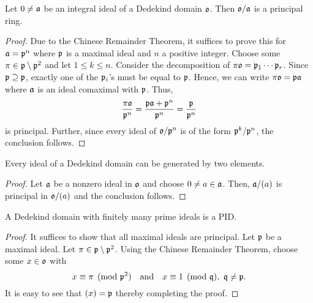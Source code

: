 \begin{proposition}
    Let $0\ne\mathfrak{a}$ be an integral ideal of a Dedekind domain $\mathfrak{o}$. Then $\mathfrak{o}/\mathfrak{a}$ is a principal ring.
\end{proposition}
\begin{proof}
    Due to the Chinese Remainder Theorem, it suffices to prove this for $\mathfrak{a} = \mathfrak{p}^n$ where $\mathfrak{p}$ is a maximal ideal and $n$ a positive integer. Choose some $\pi\in\mathfrak{p}\setminus\mathfrak{p}^2$ and let $1\le k\le n$. Consider the decomposition of $\pi\mathfrak{o} = \mathfrak{p}_1\cdots\mathfrak{p}_r$. Since $\mathfrak{p}\supseteq\mathfrak{p}$, exactly one of the $\mathfrak{p}_i$'s must be equal to $\mathfrak{p}$. Hence, we can write $\pi\mathfrak{o} = \mathfrak{p}\mathfrak{a}$ where $\mathfrak{a}$ is an ideal comaximal with $\mathfrak{p}$. Thus, 
    \begin{equation*}
        \frac{\pi\mathfrak{o}}{\mathfrak{p}^n} = \frac{\mathfrak{p}\mathfrak{a} + \mathfrak{p}^n}{\mathfrak{p}^n} = \frac{\mathfrak{p}}{\mathfrak{p}^n}
    \end{equation*}
    is principal. Further, since every ideal of $\mathfrak{o}/\mathfrak{p}^n$ is of the form $\mathfrak{p}^k/\mathfrak{p}^n$, the conclusion follows.
\end{proof}

\begin{corollary}
    Every ideal of a Dedekind domain can be generated by two elements.
\end{corollary}
\begin{proof}
    Let $\mathfrak{a}$ be a nonzero ideal in $\mathfrak{o}$ and choose $0\ne a\in\mathfrak{a}$. Then, $\mathfrak{a}/(a)$ is principal in $\mathfrak{o}/(a)$ and the conclusion follows.
\end{proof}

\begin{proposition}
    A Dedekind domain with finitely many prime ideals is a PID.
\end{proposition}
\begin{proof}
    It suffices to show that all maximal ideals are principal. Let $\mathfrak{p}$ be a maximal ideal. Let $\pi\in\mathfrak{p}\setminus\mathfrak{p}^2$. Using the Chinese Remainder Theorem, choose some $x\in\mathfrak{o}$ with 
    \begin{equation*}
        x\equiv\pi\pmod{\mathfrak{p}^2}\quad\text{and}\quad x\equiv 1\pmod{\mathfrak{q}},~\mathfrak{q}\ne\mathfrak{p}.
    \end{equation*}
    It is easy to see that $(x) = \mathfrak{p}$ thereby completing the proof.
\end{proof}

